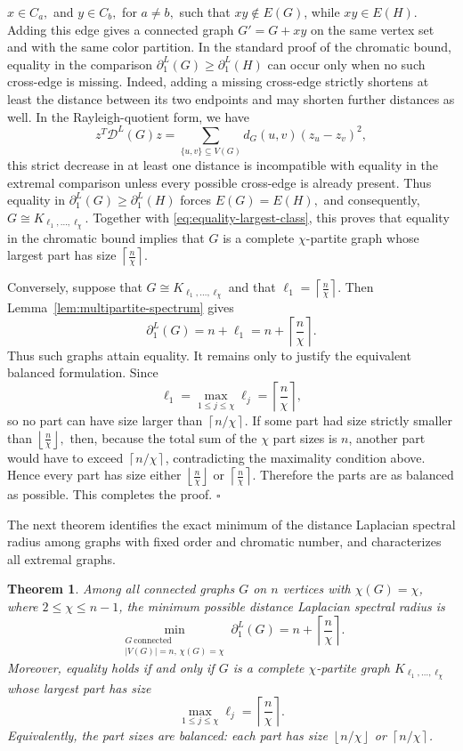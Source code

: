 \documentclass[12pt]{article}
\newcommand{\DL}{\mathcal{D}^{L}}
\newcommand{\ceil}[1]{\left\lceil #1 \right\rceil}
\newcommand{\floor}[1]{\left\lfloor #1 \right\rfloor}
\theoremstyle{plain}
\newtheorem{theorem}{Theorem}[section]
\theoremstyle{definition}
\renewenvironment{proof}{{\noindent\bfseries Proof. }}{\hfill$\square$\par}
\begin{document}
\begin{proof}
	 $x\in C_a, $ and $y\in C_b,$ for $ a\ne b,$  such that $xy\notin E(G)$, while $xy\in E(H)$.
	 Adding this edge gives a connected graph $G'=G+xy$ on the same vertex set and with the same color partition. In the standard proof of the chromatic bound, equality in the comparison $\partial_1^L(G)\ge \partial_1^L(H)$ can occur only when no such cross-edge is missing. Indeed, adding a missing cross-edge strictly shortens at least the distance between its two endpoints and may shorten further distances as well. In the Rayleigh-quotient form, we have
	\[
	z^T\DL(G)z
	=
	\sum_{\{u,v\}\subseteq V(G)} d_G(u,v)(z_u-z_v)^2,
	\]
	this strict decrease in at least one distance is incompatible with equality in the extremal comparison unless every possible cross-edge is already present. Thus equality in $\partial_1^L(G)\ge \partial_1^L(H)$ forces
	$E(G)=E(H),$ and consequently, $G\cong K_{\ell_1,\dots,\ell_\chi}.$ Together with \eqref{eq:equality-largest-class}, this proves that equality in the chromatic bound implies that $G$ is a complete $\chi$-partite graph whose largest part has size
 	$\ceil{\frac{n}{\chi}}.$ 
	
	Conversely, suppose that $G\cong K_{\ell_1,\dots,\ell_\chi}$ and that $\ell_1=\ceil{\frac{n}{\chi}}.$ Then Lemma~\ref{lem:multipartite-spectrum} gives
 \begin{equation*}
		\partial_1^L(G)=n+\ell_1
	=
	n+\ceil{\frac{n}{\chi}}.
	\end{equation*}
	Thus such graphs attain equality. 	It remains only to justify the equivalent balanced formulation. Since
	\[
	\ell_1=\max_{1\le j\le\chi}\ell_j=\ceil{\frac{n}{\chi}},
	\]
	so no part can have size larger than $\ceil{n/\chi}$. If some part had size strictly smaller than
	 $\floor{\tfrac{n}{\chi}},$ 
	then, because the total sum of the $\chi$ part sizes is $n$, another part would have to exceed
	$\ceil{n/\chi}$, contradicting the maximality condition above. Hence every part has size either
	 $\floor{\tfrac{n}{\chi}}$ or $\ceil{\tfrac{n}{\chi}}.$ Therefore the parts are as balanced as possible. This completes the proof.
\end{proof}

\medskip
\noindent  The next theorem identifies the exact minimum of the distance Laplacian spectral radius among graphs with fixed order and chromatic number, and characterizes all extremal graphs.
\begin{theorem}\label{thm:min-spectral-radius}
Among all connected graphs $G$ on $n$ vertices with $\chi(G)=\chi$, where $2\le\chi\le n-1$, the minimum possible distance
Laplacian spectral radius is
\[
    \min_{\substack{G~\mathrm{connected}\\ |V(G)|=n,\,\chi(G)=\chi}} \partial_1^L(G)
    =n+\ceil{\frac{n}{\chi}}.
\]
Moreover, equality holds if and only if $G$ is a complete $\chi$-partite graph
$K_{\ell_1,\dots,\ell_\chi}$ whose largest part has size
\[
    \max_{1\le j\le \chi}\ell_j=\ceil{\frac{n}{\chi}}.
\]
Equivalently, the part sizes are balanced: each part has size $\floor{n/\chi}$ or $\ceil{n/\chi}$.
\end{theorem}
\end{document}
